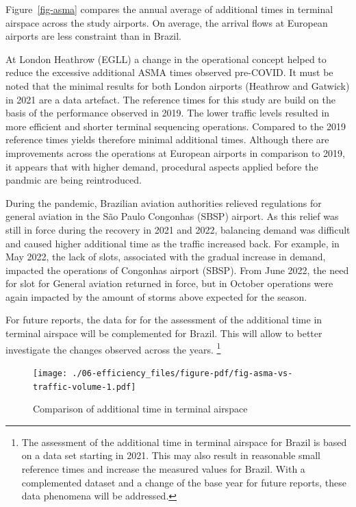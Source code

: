 \documentclass[
  a4paper,
  DIV=11,
  numbers=noendperiod]{scrreport}
\begin{document}
Figure~\ref{fig-asma} compares the annual average of additional times in
terminal airspace across the study airports. On average, the arrival
flows at European airports are less constraint than in Brazil.

At London Heathrow (EGLL) a change in the operational concept helped to
reduce the excessive additional ASMA times observed pre-COVID. It must
be noted that the minimal results for both London airports (Heathrow and
Gatwick) in 2021 are a data artefact. The reference times for this study
are build on the basis of the performance observed in 2019. The lower
traffic levels resulted in more efficient and shorter terminal
sequencing operations. Compared to the 2019 reference times yields
therefore minimal additional times. Although there are improvements
across the operations at European airports in comparison to 2019, it
appears that with higher demand, procedural aspects applied before the
pandmic are being reintroduced.

During the pandemic, Brazilian aviation authorities relieved regulations
for general aviation in the São Paulo Congonhas (SBSP) airport. As this
relief was still in force during the recovery in 2021 and 2022,
balancing demand was difficult and caused higher additional time as the
traffic increased back. For example, in May 2022, the lack of slots,
associated with the gradual increase in demand, impacted the operations
of Congonhas airport (SBSP). From June 2022, the need for slot for
General aviation returned in force, but in October operations were again
impacted by the amount of storms above expected for the season.

For future reports, the data for for the assessment of the additional
time in terminal airspace will be complemented for Brazil. This will
allow to better investigate the changes observed across the years.
\footnote{The assessment of the additional time in terminal airspace for
  Brazil is based on a data set starting in 2021. This may also result
  in reasonable small reference times and increase the measured values
  for Brazil. With a complemented dataset and a change of the base year
  for future reports, these data phenomena will be addressed.}

\begin{figure}[H]

{\centering \texttt{[image: ./06-efficiency\_files/figure-pdf/fig-asma-vs-traffic-volume-1.pdf]}

}

\caption{\label{fig-asma-vs-traffic-volume}Comparison of additional time
in terminal airspace}

\end{figure}
\end{document}
